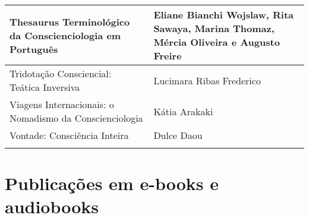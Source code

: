 \documentclass{gescons}
\begin{document}
\begin{longtable}[]{@{}
  >{\raggedright\arraybackslash}p{}
  >{\raggedright\arraybackslash}p{}@{}}
\hline
\begin{minipage}[b]{\linewidth}\raggedright
Thesaurus Terminológico da Conscienciologia em Português
\end{minipage} & \begin{minipage}[b]{\linewidth}\raggedright\addlinespace[2pt]
Eliane Bianchi Wojslaw, Rita Sawaya, Marina Thomaz, Mércia Oliveira e Augusto Freire
\end{minipage} \\
\hline
\begin{minipage}[b]{\linewidth}\raggedright
Tridotação Consciencial: Teática Inversiva
\end{minipage} & \begin{minipage}[b]{\linewidth}\raggedright
Lucimara Ribas Frederico
\end{minipage} \\
\hline
\begin{minipage}[b]{\linewidth}\raggedright
Viagens Internacionais: o Nomadismo da Conscienciologia
\end{minipage} & \begin{minipage}[b]{\linewidth}\raggedright
Kátia Arakaki
\end{minipage} \\
\hline
\begin{minipage}[b]{\linewidth}\raggedright
Vontade: Consciência Inteira
\end{minipage} & \begin{minipage}[b]{\linewidth}\raggedright
Dulce Daou
\end{minipage} \\
\midrule\noalign{}
\endhead
\bottomrule\noalign{}
\endlastfoot
\end{longtable}

\clearpage
{}
\section*{Publicações em e-books e audiobooks}
\end{document}

